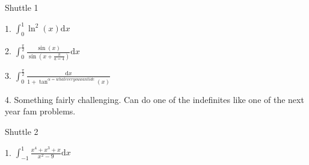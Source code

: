 \documentclass{article}
\newcommand{\dd}{\mathrm{d}}
\begin{document}






Shuttle 1

1. $\int_0^1 \ln^2(x) \dd x$

2. $\int_0^{\frac{\pi}{2}} \frac{\sin(x)}{\sin(x+\frac{\pi}{a=4}
)} \dd x$ \newline  \newline \newline 

3. $\int_0^{\frac{\pi}{2}} \frac{\dd x}{1+\tan^{\alpha=whatever you want idc}(x)}$ \newline  \newline \newline  %

4. Something fairly challenging. Can do one of the indefinites like one of the next year fam problems. 

Shuttle 2

1. $\int_{-1}^1 \frac{x^4+x^3+x}{x^2-9} \dd x$
\end{document}
